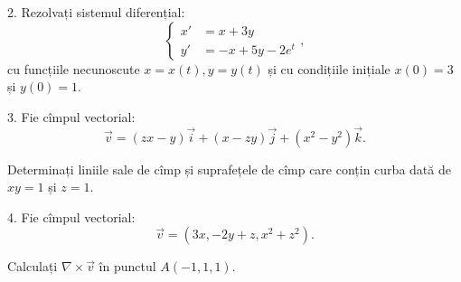 2. Rezolvați sistemul diferențial:
\[
  \begin{cases}
    x' &= x + 3y \\
    y' &= -x + 5y - 2e^t
  \end{cases},
\]
cu funcțiile necunoscute $ x = x(t), y = y(t) $ și cu condițiile inițiale
$ x(0) = 3 $ și $ y(0) = 1 $.

\vspace{1cm}

3. Fie cîmpul vectorial:
\[
  \vec{v} = (zx - y) \vec{i} + (x - zy) \vec{j} + (x^2 - y^2) \vec{k}.
\]

Determinați liniile sale de cîmp și suprafețele de cîmp care conțin curba
dată de $ xy = 1 $ și $ z = 1 $.

\vspace{1cm}

4. Fie cîmpul vectorial:
\[
  \vec{v} = (3x, -2y + z, x^2 + z^2).
\]

Calculați $ \nabla \times \vec{v} $ în punctul $ A(-1, 1, 1) $.


